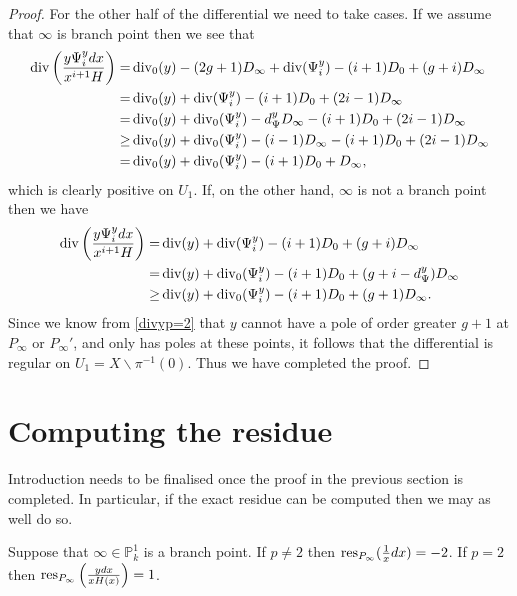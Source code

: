 \begin{proof}
For the other half of the differential we need to take cases.
If we assume that $\infty$ is branch point then we see that
\begin{align*}
\operatorname{div}\left(\frac{y\Psi_i^y dx}{x^{i+1}H} \right)  =  & \operatorname{div}_0(y) - (2g+1)D_\infty + \operatorname{div}(\Psi_i^y) - (i+1)D_0 + (g+i)D_\infty \\
 =  & \operatorname{div}_0(y) + \operatorname{div}(\Psi_i^y) -(i+1)D_0 + (2i -1)D_\infty \\
 = &  \operatorname{div}_0(y) + \operatorname{div}_0(\Psi_i^y) - d_\Psi^yD_\infty - (i+1)D_0 + (2i-1)D_\infty \\
 \geq &  \operatorname{div}_0(y) + \operatorname{div}_0(\Psi_i^y) -(i-1)D_\infty -(i+1)D_0 + (2i-1)D_\infty \\
 =   &\operatorname{div}_0(y) + \operatorname{div}_0(\Psi_i^y) -(i+1)D_0 + D_\infty,
\end{align*}
which is clearly positive on $U_1$.
If, on the other hand, $\infty$ is not a branch point then we have
\begin{align*}
\operatorname{div}\left(\frac{y\Psi_i^y dx}{x^{i+1}H} \right)  =  & \operatorname{div}(y) + \operatorname{div}(\Psi_i^y) - (i+1)D_0 + (g+i)D_\infty \\
= & \operatorname{div}(y) + \operatorname{div}_0(\Psi_i^y) - (i+1)D_0 + (g+i - d_\Psi^y)D_\infty \\
\geq & \operatorname{div}(y) + \operatorname{div}_0(\Psi_i^y) - (i+1)D_0 + (g+1)D_\infty. \\
\end{align*}
Since we know from \eqref{divyp=2} that $y$ cannot have a pole of order greater $g+1$ at $P_\infty$ or $P_\infty'$, and only has poles at these points, it follows that the differential is regular on $U_1 = X \backslash \pi^{-1}(0)$.
Thus we have completed the proof.


\end{proof}

\section{Computing the residue}

Introduction needs to be finalised once the proof in the previous section is completed.
In particular, if the exact residue can be computed then we may as well do so.

\begin{lem}
Suppose that $\infty\in \mathbb P_k^1$ is a branch point.
If $p \neq 2$ then ${\rm res}_{P_\infty}(\frac{1}{x}dx) = -2$.
If $p=2$ then ${\rm res}_{P_\infty}\left(\frac{ydx}{xH(x)}\right) = 1$.
\end{lem}

